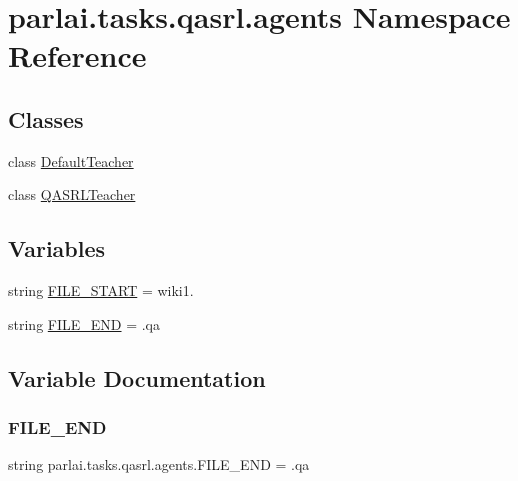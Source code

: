 \hypertarget{namespaceparlai_1_1tasks_1_1qasrl_1_1agents}{}\section{parlai.\+tasks.\+qasrl.\+agents Namespace Reference}
\label{namespaceparlai_1_1tasks_1_1qasrl_1_1agents}
\subsection*{Classes}
\begin{DoxyCompactItemize}
\item 
class \hyperlink{classparlai_1_1tasks_1_1qasrl_1_1agents_1_1DefaultTeacher}{Default\+Teacher}
\item 
class \hyperlink{classparlai_1_1tasks_1_1qasrl_1_1agents_1_1QASRLTeacher}{Q\+A\+S\+R\+L\+Teacher}
\end{DoxyCompactItemize}
\subsection*{Variables}
\begin{DoxyCompactItemize}
\item 
string \hyperlink{namespaceparlai_1_1tasks_1_1qasrl_1_1agents_ad2a9205e314e6183e0f6937197128744}{F\+I\+L\+E\+\_\+\+S\+T\+A\+RT} = \textquotesingle{}wiki1.\textquotesingle{}
\item 
string \hyperlink{namespaceparlai_1_1tasks_1_1qasrl_1_1agents_a4831d419f369db35cf35d1ea7fa0713f}{F\+I\+L\+E\+\_\+\+E\+ND} = \textquotesingle{}.qa\textquotesingle{}
\end{DoxyCompactItemize}


\subsection{Variable Documentation}
\mbox{\label{namespaceparlai_1_1tasks_1_1qasrl_1_1agents_a4831d419f369db35cf35d1ea7fa0713f}} 
\subsubsection{\texorpdfstring{F\+I\+L\+E\+\_\+\+E\+ND}{FILE\_END}}
{\footnotesize\ttfamily string parlai.\+tasks.\+qasrl.\+agents.\+F\+I\+L\+E\+\_\+\+E\+ND = \textquotesingle{}.qa\textquotesingle{}}



